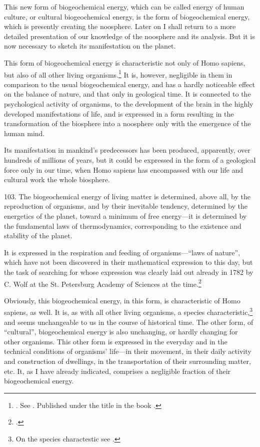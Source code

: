 This new form of biogeochemical energy, which can be called energy of human
culture, or cultural biogeochemical energy, is the form of biogeochemical
energy, which is presently creating the noosphere.  Later on I shall return to
a more detailed presentation of our knowledge of the noosphere and its
analysis.  But it is now necessary to sketch its manifestation on the planet.

This form of biogeochemical energy is characteristic not only of Homo sapiens,
but also of all other living
organisms.\footnote{
	\foreignlanguage{russian}{\cite[30--48]{vernadsky1926biosfera}}.  See
	\foreignlanguage{russian}{\cites[330--341]{vernadsky1994zhivoe}{vernadsky1926razmnozhenii1}{vernadsky1926razmnozhenii2}}.
	Published under the title \foreignlanguage{russian}{} in the book
	\foreignlanguage{russian}{\cite[75--101]{vernadsky1992trudy}}.
}  It is, however, negligible in them in comparison to the usual biogeochemical
energy, and has a hardly noticeable effect on the balance of nature, and that
only in geological time.  It is connected to the psychological activity of
organisms, to the development of the brain in the highly developed
manifestations of life, and is expressed in a form resulting in the
transformation of the biosphere into a noosphere only with the emergence of the
human mind.

Its manifestation in mankind's predecessors has been produced, apparently,
over hundreds of millions of years, but it could be expressed in the form of a
geological force only in our time, when Homo sapiens has encompassed with our
life and cultural work the whole biosphere.


103. The biogeochemical energy of living matter is determined, above all, by
the reproduction of organisms, and by their inevitable tendency, determined by
the energetics of the planet, toward a minimum of free energy---it is
determined by the fundamental laws of thermodynamics, corresponding to the
existence and stability of the planet.

It is expressed in the respiration and feeding of organisms---``laws of
nature'', which have not been discovered in their mathematical expression to
this day, but the task of searching for whose expression was clearly laid out
already in 1782 by C. Wolf at the St. Petersburg Academy of
Sciences at the
time.\foreignlanguage{russian}{\footcite[50]{vernadsky1954sochineniya}}

Obviously, this biogeochemical energy, in this form, is characteristic of Homo
sapiens, as well.  It is, as with all other living organisms, a species
characteristic,\footnote{
	On the species charactestic see \cite{vernadsky1930considerations}.
} and seems unchangeable to us in the course of historical time.  The other
form, of ``cultural'', biogeochemical energy is also unchanging, or hardly
changing for other organisms.  This other form is expressed in the everyday and
in the technical conditions of organisms' life---in their movement, in their
daily activity and construction of dwellings, in the transportation of their
surrounding matter, etc.  It, as I have already indicated, comprises a
negligible fraction of their biogeochemical energy.

